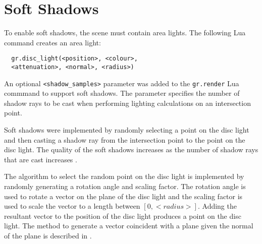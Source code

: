 \section{Soft Shadows}

To enable soft shadows, the scene must contain area lights. The following Lua 
command creates an area light:
\begin{lstlisting}
  gr.disc_light(<position>, <colour>, 
  <attenuation>, <normal>, <radius>)
\end{lstlisting}
  
An optional \verb|<shadow_samples>| parameter was added to the \newline
\verb|gr.render| Lua commmand to support soft shadows. The parameter specifies 
the number of shadow rays to be cast when performing lighting calculations on 
an intersection point.

Soft shadows were implemented by randomly selecting a point on the disc light
and then casting a shadow ray from the intersection point to the point on the
disc light. The quality of the soft shadows increases as the number of shadow
rays that are cast increases \cite{12_shirley_marschner_2009}.

The algorithm to select the random point on the disc light is implemented by
randomly generating a rotation angle and scaling factor. The rotation angle is
used to rotate a vector on the plane of the disc light and the scaling factor is 
used to scale the vector to a length between $[0, <radius>]$. Adding the 
resultant vector to the position of the disc light produces a point on the disc
light. The method to generate a vector coincident with a plane given the normal
of the plane is described in \cite{6_hughes_moller_2005}.

